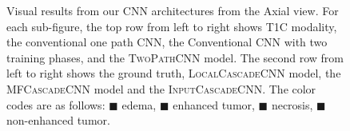 \documentclass[final,5p,times,twocolumn]{elsarticle}
\begin{document}
{\begin{figure}[p!]
\caption{Visual results from our CNN architectures from the Axial view. For each sub-figure, the top row from left to right shows T1C modality, the conventional one path CNN, the Conventional CNN with two training phases, and the \textsc{TwoPathCNN} model.  The second row from left to right shows the ground truth,  \textsc{LocalCascadeCNN} model, the \textsc{MFCascadeCNN} model and the \textsc{InputCascadeCNN}. The color codes are as follows:  \textcolor[RGB]{135,213,120}{$\blacksquare$} edema, \textcolor[RGB]{225,225,95}{$\blacksquare$} enhanced tumor,
\textcolor[RGB]{246,145,139}{$\blacksquare$} necrosis,
\textcolor[RGB]{124,167,208}{$\blacksquare$} non-enhanced tumor.}
\label{fig:results}
\end{figure} 

 
 
 
 

 }
\end{document}
